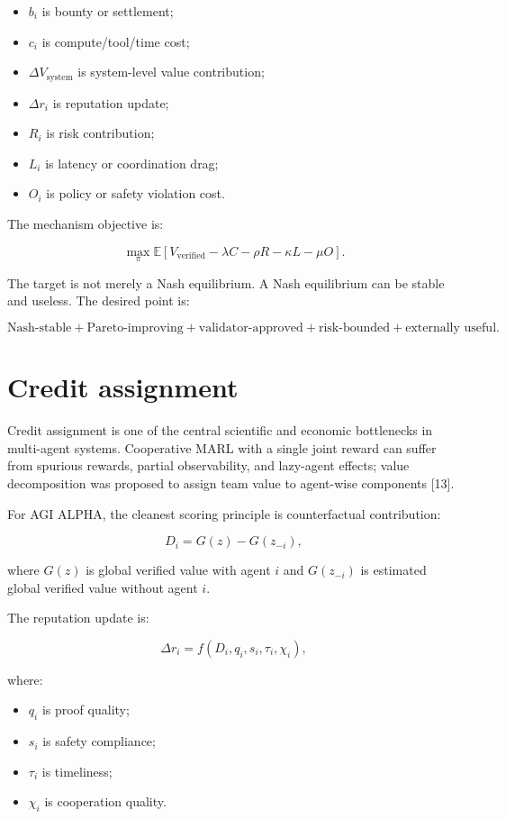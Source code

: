 \documentclass[11pt]{article}
\providecommand{\tightlist}{\setlength{\itemsep}{0pt}\setlength{\parskip}{0pt}}
\begin{document}
\begin{itemize}
\tightlist
\item
  \(b_i\) is bounty or settlement;
\item
  \(c_i\) is compute/tool/time cost;
\item
  \(\Delta V_{\text{system}}\) is system-level value contribution;
\item
  \(\Delta r_i\) is reputation update;
\item
  \(R_i\) is risk contribution;
\item
  \(L_i\) is latency or coordination drag;
\item
  \(O_i\) is policy or safety violation cost.
\end{itemize}

The mechanism objective is:

\[
\max_{\pi}\mathbb{E}[V_{\text{verified}}-\lambda C-\rho R-\kappa L-\mu O].
\]

The target is not merely a Nash equilibrium. A Nash equilibrium can be
stable and useless. The desired point is:

\[
\text{Nash-stable}+
\text{Pareto-improving}+
\text{validator-approved}+
\text{risk-bounded}+
\text{externally useful}.
\]

\section{Credit assignment}\label{credit-assignment}

Credit assignment is one of the central scientific and economic
bottlenecks in multi-agent systems. Cooperative MARL with a single joint
reward can suffer from spurious rewards, partial observability, and
lazy-agent effects; value decomposition was proposed to assign team
value to agent-wise components {[}13{]}.

For AGI ALPHA, the cleanest scoring principle is counterfactual
contribution:

\[
D_i=G(z)-G(z_{-i}),
\]

where \(G(z)\) is global verified value with agent \(i\) and
\(G(z_{-i})\) is estimated global verified value without agent \(i\).

The reputation update is:

\[
\Delta r_i=f(D_i,q_i,s_i,\tau_i,\chi_i),
\]

where:

\begin{itemize}
\tightlist
\item
  \(q_i\) is proof quality;
\item
  \(s_i\) is safety compliance;
\item
  \(\tau_i\) is timeliness;
\item
  \(\chi_i\) is cooperation quality.
\end{itemize}
\end{document}
